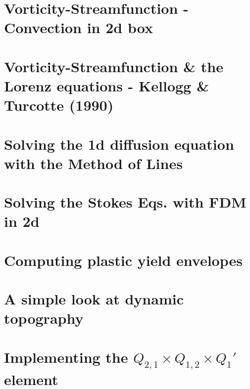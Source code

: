 \documentclass[a4paper,11pt]{report}
\begin{document}
\chapter{Vorticity-Streamfunction - Convection in 2d box \label{f155}} %

\chapter{Vorticity-Streamfunction \& the Lorenz equations - Kellogg \& Turcotte (1990)  \label{f156}} %

\chapter{Solving the 1d diffusion equation with the Method of Lines  \label{f157}} %

\chapter{Solving the Stokes Eqs. with FDM in 2d \label{f158}} %

\chapter{Computing plastic yield envelopes \label{f159}} %

\chapter{A simple look at dynamic topography \label{f160}} %

\chapter{Implementing the $Q_{2,1}\times Q_{1,2} \times Q_{1}'$ element \label{f161}} %
\end{document}
